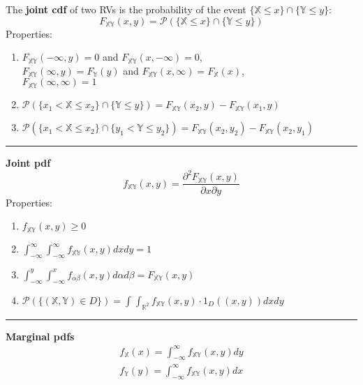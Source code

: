 \documentclass{article}
\renewcommand{\P}{\mathcal{P}}
\providecommand{\X}{\mathbb{X}}
\providecommand{\Y}{\mathbb{Y}}
\providecommand{\R}{\mathbb{R}}
\begin{document}
\begin{multicols*}{3}
        The \textbf{joint cdf} of two RVs is the probability of the event $\{\X\leq x\}\cap\{\Y\leq y\}$:
        \begin{equation*}
            F_{\X\Y}(x,y) = \P(\{\X\leq x\}\cap\{\Y\leq y\})
        \end{equation*}
        Properties:
        \begin{enumerate}
            \item $F_{\X\Y}(-\infty,y)=0$ and $F_{\X\Y}(x, -\infty)=0$,\\
            $F_{\X\Y}(\infty,y)=F_{\Y}(y)$ and $F_{\X\Y}(x, \infty)=F_{\X}(x)$,\\
            $F_{\X\Y}(\infty,\infty)=1$
            \item $\P(\{x_1<\X\leq x_2\}\cap\{\Y\leq y\}) = F_{\X\Y}(x_2,y) - F_{\X\Y}(x_1,y)$
            \item $\P(\{x_1<\X\leq x_2\}\cap\{y_1<\Y\leq y_2\}) = F_{\X\Y}(x_2,y_2) - F_{\X\Y}(x_2,y_1) $
        \end{enumerate}

        \noindent\rule{\columnwidth}{0.4pt}

        \textbf{Joint pdf}
        \begin{equation*}
            f_{\X\Y}(x,y) = \frac{\partial^{2}F_{\X\Y}(x,y)}{\partial x\partial y}
        \end{equation*}
        Properties:
        \begin{enumerate}
            \item $f_{\X\Y}(x,y)\geq 0$
            \item $\int_{-\infty}^{\infty} \int_{-\infty}^{\infty} f_{\X\Y}(x,y)dxdy = 1$
            \item $\int_{-\infty}^{y} \int_{-\infty}^{x} f_{\alpha\beta}(x,y)d\alpha d\beta = F_{\X\Y}(x,y)$
            \item $\P(\{(\X,\Y)\in D\}) = \int_{}^{} \int_{\R^2} f_{\X\Y}(x,y)\cdot 1_D((x,y))dxdy$
        \end{enumerate}

        \noindent\rule{\columnwidth}{0.4pt}

        \textbf{Marginal pdfs}
        \begin{equation*}
            \begin{gathered}
                f_{\X}(x)=\int_{-\infty}^{\infty} f_{\X\Y}(x,y)dy\\
                f_{\Y}(y)=\int_{-\infty}^{\infty} f_{\X\Y}(x,y)dx
            \end{gathered}
        \end{equation*}


\end{multicols*}
\end{document}
